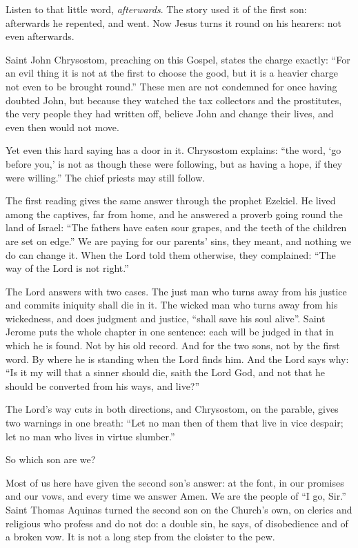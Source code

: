Listen to that little word, \emph{afterwards}. The story used it of the first
son: afterwards he repented, and went. Now Jesus turns it round on his
hearers: not even afterwards.

Saint John Chrysostom, preaching on this Gospel, states the charge exactly:
``For an evil thing it is not at the first to choose the good, but it is a
heavier charge not even to be brought round.'' These men are not condemned for
once having doubted John, but because they watched the tax collectors and the
prostitutes, the very people they had written off, believe John and change
their lives, and even then would not move.

Yet even this hard saying has a door in it. Chrysostom explains: ``the word,
`go before you,' is not as though these were following, but as having a hope,
if they were willing.'' The chief priests may still follow.

\bigskip

The first reading gives the same answer through the prophet Ezekiel. He lived
among the captives, far from home, and he answered a proverb going round the
land of Israel: ``The fathers have eaten sour grapes, and the teeth of the
children are set on edge.'' We are paying for our parents' sins, they meant,
and nothing we do can change it. When the Lord told them otherwise, they
complained: ``The way of the Lord is not right.''

The Lord answers with two cases. The just man who turns away from his justice
and commits iniquity shall die in it. The wicked man who turns away from his
wickedness, and does judgment and justice, ``shall save his soul alive''.
Saint Jerome puts the whole chapter in one sentence: each will be judged in
that in which he is found. Not by his old record. And for the two sons, not by
the first word. By where he is standing when the Lord finds him. And the Lord says why: ``Is it
my will that a sinner should die, saith the Lord God, and not that he should
be converted from his ways, and live?''

The Lord's way cuts in both directions, and Chrysostom, on the parable, gives
two warnings in one breath: ``Let no man then of them that live in vice
despair; let no man who lives in virtue slumber.''

\bigskip

So which son are we?

Most of us here have given the second son's answer: at the font, in our
promises and our vows, and every time we answer Amen. We are the people of ``I
go, Sir.'' Saint Thomas Aquinas turned the second son on the Church's own, on
clerics and religious who profess and do not do: a double sin, he says, of
disobedience and of a broken vow. It is not a long step from the cloister to
the pew.

